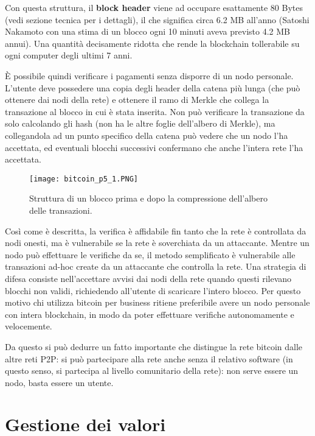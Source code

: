 Con questa struttura, il \textbf{block header} viene ad occupare esattamente 80 Bytes (vedi sezione tecnica per i dettagli), il che significa circa 6.2 MB all'anno (Satoshi Nakamoto con una stima di un blocco ogni 10 minuti aveva previsto 4.2 MB annui). Una quantità decisamente ridotta che rende la blockchain tollerabile su ogni computer degli ultimi 7 anni.

È possibile quindi verificare i pagamenti senza disporre di un nodo personale. L'utente deve possedere una copia degli header della catena più lunga (che può ottenere dai nodi della rete) e ottenere il ramo di Merkle che collega la transazione al blocco in cui è stata inserita. Non può verificare la transazione da solo calcolando gli hash (non ha le altre foglie dell'albero di Merkle), ma collegandola ad un punto specifico della catena può vedere che un nodo l'ha accettata, ed eventuali blocchi successivi confermano che anche l'intera rete l'ha accettata.

\begin{figure}[htbp]
\centering
\texttt{[image: bitcoin\_p5\_1.PNG]}
\caption{Struttura di un blocco prima e dopo la compressione dell'albero delle transazioni.\label{bitcoin_p5_1}}
\end{figure}

Così come è descritta, la verifica è affidabile fin tanto che la rete è controllata da nodi onesti, ma è vulnerabile se la rete è soverchiata da un attaccante. Mentre un nodo può effettuare le verifiche da se, il metodo semplificato è vulnerabile alle transazioni ad-hoc create da un attaccante che controlla la rete. Una strategia di difesa consiste nell'accettare avvisi dai nodi della rete quando questi rilevano blocchi non validi, richiedendo all'utente di scaricare l'intero blocco. Per questo motivo chi utilizza bitcoin per business ritiene preferibile avere un nodo personale con intera blockchain, in modo da poter effettuare verifiche autonomamente e velocemente.

Da questo si può dedurre un fatto importante che distingue la rete bitcoin dalle altre reti P2P: si può partecipare alla rete anche senza il relativo software (in questo senso, si partecipa al livello comunitario della rete): non serve essere un nodo, basta essere un utente.

\section{Gestione dei valori}\label{gestione-dei-valori}

